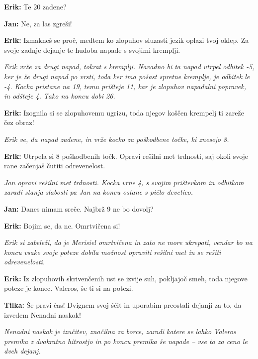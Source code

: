 \textbf{Erik:} Te 20 zadene?

\textbf{Jan:} Ne, za las zgreši!

\textbf{Erik:} Izmakneš se proč, medtem ko zlopuhov sluzasti jezik oplazi tvoj oklep. Za svoje zadnje dejanje te hudoba napade s svojimi kremplji.

\vspace{20pt}
\textit{Erik vrže za drugi napad, tokrat s kremplji. Navadno bi ta napad utrpel odbitek -5, ker je že drugi napad po vrsti, toda ker ima pošast spretne kremplje, je odbitek le -4. Kocka pristane na 19, temu prišteje 11, kar je zlopuhov napadalni popravek, in odšteje 4. Tako na koncu dobi 26.}
\vspace{20pt}

\textbf{Erik:} Izognila si se zlopuhovemu ugrizu, toda njegov koščen krempelj ti zareže čez obraz!

\vspace{20pt}
\textit{Erik ve, da napad zadene, in vrže kocko za poškodbene točke, ki znesejo 8.}
\vspace{20pt}

\textbf{Erik:} Utrpela si 8 poškodbenih točk. Opravi rešilni met trdnosti, saj okoli svoje rane začenjaš čutiti odrevenelost.

\vspace{20pt}
\textit{Jan opravi rešilni met trdnosti. Kocka vrne 4, s svojim prištevkom in odbitkom zaradi stanja slabosti pa Jan na koncu ostane s pičlo devetico.}
\vspace{20pt}

\textbf{Jan:} Danes nimam sreče. Najbrž 9 ne bo dovolj?

\textbf{Erik:} Bojim se, da ne. Omrtvičena si!

\vspace{20pt}
\textit{Erik si zabeleži, da je Merisiel omrtvičena in zato ne more ukrepati, vendar bo na koncu vsake svoje poteze dobila možnost opraviti rešilni met in se rešiti odrevenelosti.}
\vspace{20pt}

\textbf{Erik:} Iz zlopuhovih skrivenčenih ust se izvije suh, pokljajoč smeh, toda njegove poteze je konec. Valeros, še ti si na potezi.

\textbf{Tilka:} Še pravi čas! Dvignem svoj ščit in uporabim preostali dejanji za to, da izvedem Nenadni naskok!

\vspace{20pt}
\textit{Nenadni naskok je izučitev, značilna za borce, zaradi katere se lahko Valeros premika z dvakratno hitrostjo in po koncu premika še napade -- vse to za ceno le dveh dejanj.}
\vspace{20pt}


